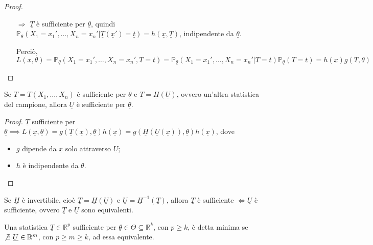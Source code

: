 \documentclass[hidelinks, 10pt]{report}
\begin{document}
\begin{proof}
\begin{itemize}
\item[$ \Rightarrow $] $ \underline{T} $ \`e sufficiente per $ \underline{\theta} $, quindi $ \mathbb{P}_{\underline{\theta}} (X_1 = x_1', \dotsc, X_n = x_n' \vert \underline{T} (\underline{x}') = \underline{t}) = h(\underline{x}, \underline{T}) $, indipendente da $ \underline{\theta} $.

Perci\`o, $ L(\underline{x}, \underline{\theta}) = \mathbb{P}_{\underline{\theta}} (X_1 = x_1', \dotsc, X_n = x_n', \underline{T} = \underline{t}) = \mathbb{P}_{\underline{\theta}} (X_1 = x_1', \dotsc, X_n = x_n' \vert \underline{T} = \underline{t}) \mathbb{P}_{\underline{\theta}} (\underline{T} = \underline{t}) = h(\underline{x}) g(\underline{T}, \underline{\theta}) $
\end{itemize}
\end{proof}

\begin{cor}	\label{cor:1}
Se $ \underline{T} = \underline{T} (X_1, \dotsc, X_n) $ \`e sufficiente per $ \underline{\theta} $ e $ \underline{T} = \underline{H}(\underline{U}) $, ovvero un'altra statistica del campione, allora $ \underline{U} $ \`e sufficiente per $ \underline{\theta} $.
\end{cor}

\begin{proof}
$ \underline{T} $ sufficiente per $ \underline{\theta} \implies L (\underline{x}, \underline{\theta}) = g(\underline{T}(\underline{x}), \underline{\theta}) h(\underline{x}) = g(\underline{H}(\underline{U}(\underline{x})), \underline{\theta}) h(\underline{x}) $, dove
\begin{itemize}
\item $ g $ dipende da $ \underline{x} $ solo attraverso $ \underline{U} $;
\item $ h $ \`e indipendente da $ \theta $.
\end{itemize}
\end{proof}

\begin{nota}
Se $ \underline{H} $ \`e invertibile, cio\`e $ \underline{T} = \underline{H}(\underline{U}) $ e $ \underline{U} = \underline{H}^{-1}(\underline{T}) $, allora $ \underline{T} $ \`e sufficiente $ \iff \underline{U} $ \`e sufficiente, ovvero $ \underline{T} $ e $ \underline{U} $ sono equivalenti.
\end{nota}

\begin{defn}
Una statistica $ \underline{T} \in \mathbb{R}^p $ sufficiente per $ \underline{\theta} \in \Theta \subseteq \mathbb{R}^k $, con $ p \ge k $, \`e detta minima se $ \not\exists\ \underline{U} \in \mathbb{R}^m $, con $ p \ge m \ge k $, ad essa equivalente.
\end{defn}
\end{document}
